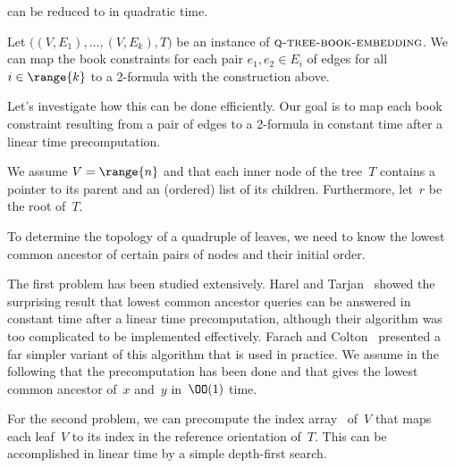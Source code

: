 \begin{lemma}
\label{lemma:q-tree-redux}
\probQTree can be reduced to \probTwoSat in quadratic time.
\end{lemma}
\begin{myproof}
Let $\bigl((V, E_1),\dotsc, (V, E_k), T\bigr)$ be an instance of $\textsc{q-tree-book-embedding}$.
We can map the book constraints for each pair $e_1, e_2 \in E_i$ of edges for all
$i \in \range{k}$ to a 2-\CNF formula with the construction above.

Let's investigate how this can be done efficiently. Our goal is
to map each book constraint resulting from a pair of edges to a 2-\CNF formula in constant
time after a linear time precomputation. 

We assume $V = \range{n}$ and that each inner node of the tree~$T$ 
contains a pointer to its parent and an (ordered) list of its children.
Furthermore, let~$r$ be the root of~$T$.

%
%
%

To determine the topology of a quadruple of leaves, we need to know
the lowest common ancestor of certain pairs of nodes and their initial order.

The first problem has been studied extensively. Harel and Tarjan~\cite{Harel84} showed
the surprising result that lowest common ancestor queries can be answered in constant
time after a linear time precomputation, although their algorithm was too complicated to be implemented
effectively. Farach and Colton~\cite{Farach00} presented a far simpler variant of this
algorithm that is used in practice. We assume in the following that the precomputation has 
been done and that  gives the lowest common ancestor of~$x$ and~$y$ in~$\OO(1)$ time.

For the second problem, we can precompute the index array~ of~$V$ that maps each
leaf~$V$ to its index in the reference orientation of~$T$. This can be accomplished in linear time by a simple depth-first search. 


\end{myproof}
